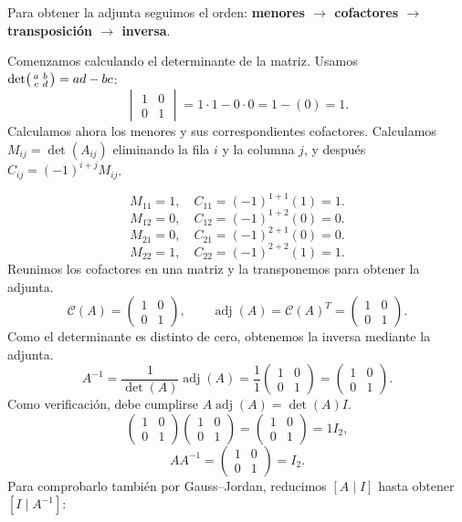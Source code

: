 \documentclass[12pt]{article}
\newcommand{\adj}{\operatorname{adj}}
\begin{document}
Para obtener la adjunta seguimos el orden: \textbf{menores $\to$ cofactores $\to$ transposición $\to$ inversa}.

Comenzamos calculando el determinante de la matriz.
Usamos $\det\begin{psmallmatrix}a&b\\c&d\end{psmallmatrix}=ad-bc$:
\[
\begin{vmatrix}1&0\\0&1\end{vmatrix}=1\cdot 1-0\cdot 0=1-(0)=1.
\]
Calculamos ahora los menores y sus correspondientes cofactores. Calculamos $M_{ij}=\det(A_{ij})$ eliminando la fila $i$ y la columna $j$, y después $C_{ij}=(-1)^{i+j}M_{ij}$.

\[
M_{11}=1,\quad C_{11}=(-1)^{1+1}(1)=1.
\]
\[
M_{12}=0,\quad C_{12}=(-1)^{1+2}(0)=0.
\]
\[
M_{21}=0,\quad C_{21}=(-1)^{2+1}(0)=0.
\]
\[
M_{22}=1,\quad C_{22}=(-1)^{2+2}(1)=1.
\]
Reunimos los cofactores en una matriz y la transponemos para obtener la adjunta.
\[
\mathcal{C}(A)=\begin{pmatrix}1&0\\0&1\end{pmatrix},\qquad\adj(A)=\mathcal{C}(A)^T=\begin{pmatrix}1&0\\0&1\end{pmatrix}.
\]
Como el determinante es distinto de cero, obtenemos la inversa mediante la adjunta.
\[
A^{-1}=\frac1{\det(A)}\adj(A)=\frac1{1}\begin{pmatrix}1&0\\0&1\end{pmatrix}=\begin{pmatrix}1&0\\0&1\end{pmatrix}.
\]
Como verificación, debe cumplirse $A\adj(A)=\det(A)I$.
\[
\begin{pmatrix}1&0\\0&1\end{pmatrix}\begin{pmatrix}1&0\\0&1\end{pmatrix}=\begin{pmatrix}1&0\\0&1\end{pmatrix}=1I_{2},
\]
\[
AA^{-1}=\begin{pmatrix}1&0\\0&1\end{pmatrix}=I_{2}.
\]
Para comprobarlo también por Gauss--Jordan, reducimos $[A\mid I]$ hasta obtener $[I\mid A^{-1}]$:
\end{document}
